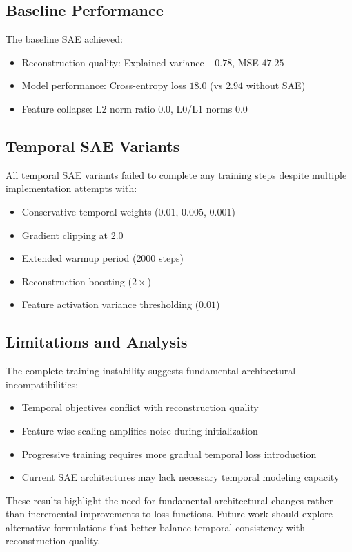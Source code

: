 \documentclass{article} %
\begin{document}
\subsection{Baseline Performance}
The baseline SAE achieved:
\begin{itemize}
    \item Reconstruction quality: Explained variance $-0.78$, MSE $47.25$
    \item Model performance: Cross-entropy loss $18.0$ (vs $2.94$ without SAE)
    \item Feature collapse: L2 norm ratio $0.0$, L0/L1 norms $0.0$
\end{itemize}

\subsection{Temporal SAE Variants}
All temporal SAE variants failed to complete any training steps despite multiple implementation attempts with:
\begin{itemize}
    \item Conservative temporal weights ($0.01$, $0.005$, $0.001$)
    \item Gradient clipping at $2.0$
    \item Extended warmup period ($2000$ steps)
    \item Reconstruction boosting ($2\times$)
    \item Feature activation variance thresholding ($0.01$)
\end{itemize}

\subsection{Limitations and Analysis}
The complete training instability suggests fundamental architectural incompatibilities:
\begin{itemize}
    \item Temporal objectives conflict with reconstruction quality
    \item Feature-wise scaling amplifies noise during initialization
    \item Progressive training requires more gradual temporal loss introduction
    \item Current SAE architectures may lack necessary temporal modeling capacity
\end{itemize}

These results highlight the need for fundamental architectural changes rather than incremental improvements to loss functions. Future work should explore alternative formulations that better balance temporal consistency with reconstruction quality.
\end{document}
